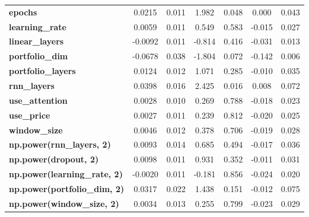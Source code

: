 \begin{center}
\begin{tabular}{lcccccc}
\textbf{epochs}                            &       0.0215  &        0.011     &     1.982  &         0.048        &        0.000    &        0.043     \\
\textbf{learning\_rate}                    &       0.0059  &        0.011     &     0.549  &         0.583        &       -0.015    &        0.027     \\
\textbf{linear\_layers}                    &      -0.0092  &        0.011     &    -0.814  &         0.416        &       -0.031    &        0.013     \\
\textbf{portfolio\_dim}                    &      -0.0678  &        0.038     &    -1.804  &         0.072        &       -0.142    &        0.006     \\
\textbf{portfolio\_layers}                 &       0.0124  &        0.012     &     1.071  &         0.285        &       -0.010    &        0.035     \\
\textbf{rnn\_layers}                       &       0.0398  &        0.016     &     2.425  &         0.016        &        0.008    &        0.072     \\
\textbf{use\_attention}                    &       0.0028  &        0.010     &     0.269  &         0.788        &       -0.018    &        0.023     \\
\textbf{use\_price}                        &       0.0027  &        0.011     &     0.239  &         0.812        &       -0.020    &        0.025     \\
\textbf{window\_size}                      &       0.0046  &        0.012     &     0.378  &         0.706        &       -0.019    &        0.028     \\
\textbf{np.power(rnn\_layers, 2)}          &       0.0093  &        0.014     &     0.685  &         0.494        &       -0.017    &        0.036     \\
\textbf{np.power(dropout, 2)}              &       0.0098  &        0.011     &     0.931  &         0.352        &       -0.011    &        0.031     \\
\textbf{np.power(learning\_rate, 2)}       &      -0.0020  &        0.011     &    -0.181  &         0.856        &       -0.024    &        0.020     \\
\textbf{np.power(portfolio\_dim, 2)}       &       0.0317  &        0.022     &     1.438  &         0.151        &       -0.012    &        0.075     \\
\textbf{np.power(window\_size, 2)}         &       0.0034  &        0.013     &     0.255  &         0.799        &       -0.023    &        0.029     \\

\end{tabular}
\end{center}
